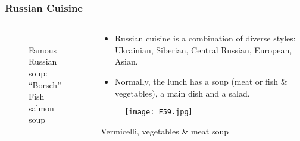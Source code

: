 \documentclass[pdflatex,compress,8pt,
	xcolor={dvipsnames,dvipsnames,svgnames,x11names,table},
	hyperref={colorlinks = true,breaklinks = true, urlcolor = NavyBlue, breaklinks = true}]{beamer}
\begin{document}
\begin{frame}\frametitle{Russian Cuisine}
\begin{minipage}[0.4\textheight]{\textwidth}
\begin{columns}[T]
\begin{column}{0.5\textwidth}
\begin{figure}[H]
	\centering
		\\
		Famous Russian soup: “Borsch”
			\vspace{1mm}
		\\
		Fish salmon soup
\end{figure}
\end{column}
\begin{column}{0.5\textwidth}
\vspace{1em} 
\begin{itemize}
	\item Russian cuisine is a combination of diverse styles: Ukrainian, Siberian, Central Russian, European, Asian.
	\item Normally, the lunch has a soup (meat or fish \& vegetables), a main dish and a salad. 
\end{itemize}
\begin{figure}[H]
	\centering
		\texttt{[image: F59.jpg]}
\end{figure}
Vermicelli, vegetables \& meat soup
\end{column}
\end{columns}
\end{minipage}
\end{frame}
\end{document}
